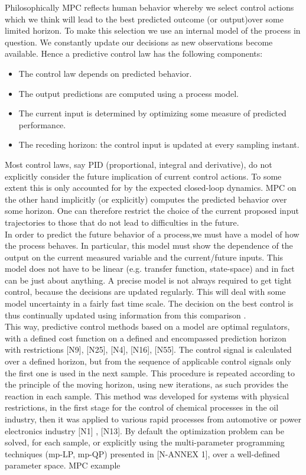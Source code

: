 Philosophically MPC reflects human behavior whereby we select control actions which we think will lead to the best predicted outcome (or output)over some limited horizon. To make this selection we use an internal model of the process in question. We constantly update our decisions as new observations become available. Hence a predictive control law has the following components:
\begin{itemize}
\item The control law depends on predicted behavior.
\item The output predictions are computed using a process model.
\item The current input is determined by optimizing some measure of predicted performance.
\item The receding horizon: the control input is updated at every sampling instant.
\end{itemize}

Most control laws, say PID (proportional, integral and derivative), do not explicitly consider the future implication of current control actions. To some extent this is only accounted for by the expected closed-loop dynamics. MPC on the other hand
implicitly (or explicitly) computes the predicted behavior over some horizon. One can therefore restrict the choice of the current proposed input trajectories to those that do not lead to difficulties in the future.\\
In order to predict the future behavior of a process,we must have a model of how the process behaves. In particular, this model must show the dependence of the output on the current measured variable and the current/future inputs. This model does not
have to be linear (e.g. transfer function, state-space) and in fact can be just about anything. A precise model is not always required to get tight control, because the decisions are updated regularly. This will deal with some model uncertainty in a fairly
fast time scale. The decision on the best control is thus continually updated using information from this comparison \cite{rossiter2017model}.\\
This way, predictive control methods based on a model are optimal regulators, with a defined cost function on a defined and encompassed  	prediction horizon with restrictions [N9], [N25], [N4], [N16], [N55]. The control signal is calculated over a defined horizon, but from the sequence of applicable control signals only the first one is used in the next sample. This procedure is repeated according to the principle of the moving horizon, using new iterations, as such provides the reaction in each sample. This method was developed for systems with physical restrictions, in the first stage for the control of chemical processes in the oil industry, then it was applied to various rapid processes from automotive or power electronics industry [N1] , [N13]. By default the optimization problem can be solved, for each sample, or explicitly using the multi-parameter programming techniques (mp-LP, mp-QP) presented in [N-ANNEX 1], over a well-defined parameter space.
	MPC example
	
